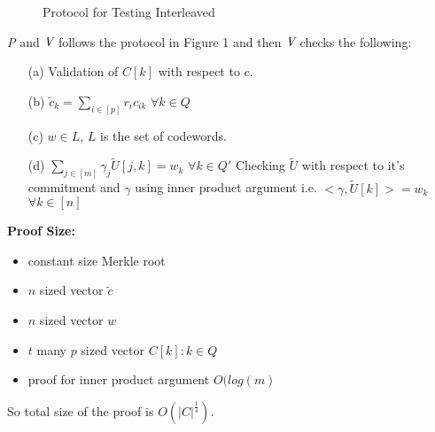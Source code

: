 \begin{figure}[htb!]
	\centering
	\caption{Protocol for Testing Interleaved}
\end{figure}
\FloatBarrier

\textit{P} and $\textit{V}$ follows the protocol in Figure 1 and then
$\textit{V}$ checks the following:
\begin{itemize}
	\item[(a)] Validation of $C[k]$ with respect to $c$.
	\item[(b)] $\tilde{c}_k = \sum\limits_{i\in[p]} r_ic_{ik}$ $\forall k\in Q$
	\item[(c)] $w\in L$, $L$ is the set of codewords.
	\item[(d)] $\sum\limits_{j\in [m]} \gamma_j \widetilde{U}[j,k] = w_k$ $\forall k\in Q'$ Checking $\widetilde{U}$ with respect to it's commitment and $\gamma$ using inner product argument i.e. $<\gamma,  \widetilde{U}[k]>=w_k$ $\forall k\in[n]$
\end{itemize}

\textbf{Proof Size:} 
\begin{itemize} 
	\item constant size Merkle root
	\item $n$ sized vector $\tilde{c}$
	\item $n$ sized vector $w$
	\item $t$ many $p$ sized vector $C[k]:k\in Q$
	\item proof for inner product argument $O(log(m)$
\end{itemize}
So total size of the proof is $O(|C|^{\frac{1}{4}})$.

